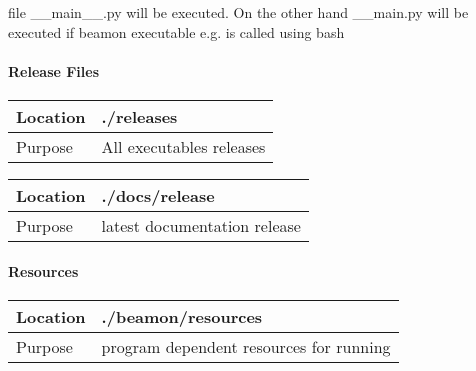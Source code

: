 \documentclass[letterpaper,10pt,english]{sphinxmanual}
\begin{document}
\begin{sphinxVerbatim}[commandchars=\\\{\}]
  
\end{sphinxVerbatim}

file \_\_main\_\_.py will be executed.
On the other hand \_\_main.py will be executed if beamon executable e.g.  is called using bash


\paragraph{Release Files}
\label{\detokenize{structure:release-files}}

\begin{savenotes}\sphinxattablestart
\centering
\begin{tabulary}{\linewidth}[t]{|T|T|}
\hline

Location
&
./releases
\\
\hline
Purpose
&
All executables releases
\\
\hline
\end{tabulary}
\par
\sphinxattableend\end{savenotes}


\begin{savenotes}\sphinxattablestart
\centering
\begin{tabulary}{\linewidth}[t]{|T|T|}
\hline

Location
&
./docs/release
\\
\hline
Purpose
&
latest documentation release
\\
\hline
\end{tabulary}
\par
\sphinxattableend\end{savenotes}


\paragraph{Resources}
\label{\detokenize{structure:resources}}

\begin{savenotes}\sphinxattablestart
\centering
\begin{tabulary}{\linewidth}[t]{|T|T|}
\hline

Location
&
./beamon/resources
\\
\hline
Purpose
&
program dependent resources for running
\\
\hline
\end{tabulary}
\par
\sphinxattableend\end{savenotes}
\end{document}
